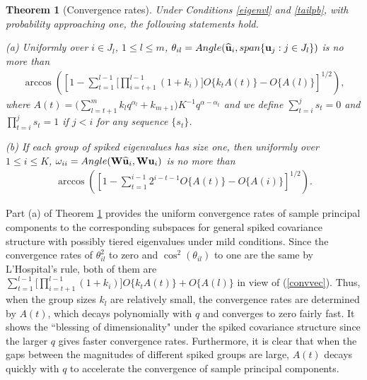 \documentclass{statsoc}
\newtheorem{theorem}{Theorem}
\newcommand{\bu}{\mbox{\bf u}}
\newcommand{\bW}{\mbox{\bf W}}
\begin{document}
\begin{theorem}[Convergence rates] \label{Thmpred}
Under Conditions \ref{eigenvl} and \ref{tailpb}, with probability approaching one, the following statements hold.

(a) Uniformly over $i \in J_l$, $1 \leq l \leq m$, $\theta_{il} = Angle(\widehat{\bu}_i, span\{\bu_j: j \in J_l\})$ is no more than
\begin{align}\label{convvec}
\arccos([1 - \sum_{t = 1}^{l - 1} \big[\prod_{i = t + 1}^{l - 1} (1 + k_i)\big] O\{k_t A(t)\} - O\{A(l)\}]^{1/2}),
\end{align}
where $A(t) = \big(\sum_{l = t + 1}^m k_l q^{\alpha_l} + k_{m + 1} \big) K^{-1} q^{\alpha - \alpha_t}$ and we define $\sum_{t = i}^{j} s_t = 0$ and $\prod_{t = i}^{j} s_t = 1$ if $j < i$ for any sequence $\{s_t\}$.

\smallskip

(b) If each group of spiked eigenvalues has size one, then uniformly over $1 \leq i \leq K$, $\omega_{ii} = Angle(\bW \widehat{\bu}_i, \bW \bu_i)$ is no more than
\begin{align*}
\arccos([1 - \sum_{t = 1}^{i - 1} 2^{i - t - 1} O\{A(t)\} - O\{A(i)\}]^{1/2}).
\end{align*}
\end{theorem}

Part (a) of Theorem \ref{Thmpred} provides the uniform convergence rates of sample principal components to the corresponding subspaces for general spiked covariance structure with possibly tiered eigenvalues under mild conditions. Since the convergence rates of $\theta^2_{il}$ to zero and $\cos^2(\theta_{il})$ to one are the same by L'Hospital's rule, both of them are $\sum_{t = 1}^{l - 1} \big[\prod_{i = t + 1}^{l - 1} (1 + k_i)\big] O\{k_t A(t)\} + O\{A(l)\}$ in view of (\ref{convvec}). Thus, when the group sizes $k_l$ are relatively small, the convergence rates are determined by $A(t)$, which decays polynomially with $q$ and converges to zero fairly fast. It shows the ``blessing of dimensionality" under the spiked covariance structure since the larger $q$ gives faster convergence rates. Furthermore, it is clear that when the gaps between the magnitudes of different spiked groups are large, $A(t)$ decays quickly with $q$ to accelerate the convergence of sample principal components.
\end{document}
